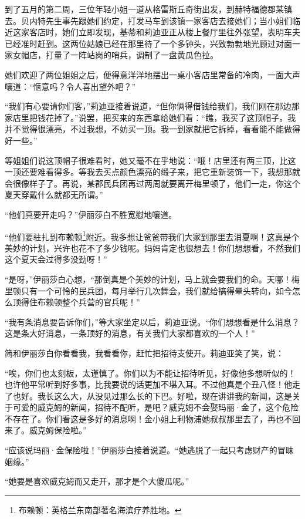 \par 到了五月的第二周，三位年轻小姐一道从格雷斯丘奇街出发，到赫特福德郡某镇去。贝内特先生事先跟她们约定，打发马车到该镇一家客店去接她们；当小姐们临近这家客店时，她们立即发现，基蒂和莉迪亚正从楼上餐厅里往外张望，表明车夫已经准时赶到。这两位姑娘已经在那里待了一个多钟头，兴致勃勃地光顾过对面一家女帽店，打量了一阵站岗的哨兵，调制了一盘黄瓜色拉。
\par 她们欢迎了两位姐姐之后，便得意洋洋地摆出一桌小客店里常备的冷肉，一面大声嚷道：“惬意吗？令人喜出望外吧？”
\par “我们有心要请你们客，”莉迪亚接着说道，“但你俩得借钱给我们，我们刚在那边那家店里把钱花掉了。”说罢，把买来的东西拿给她们看：“瞧，我买了这顶帽子。我并不觉得很漂亮，不过我想，不妨买一顶。我一到家就把它拆掉，看看能不能做得好一些。”
\par 等姐姐们说这顶帽子很难看时，她又毫不在乎地说：“哦！店里还有两三顶，比这一顶还要难看得多。等我去买点颜色漂亮的缎子来，把它重新装饰一下，我想那就会很像样子了。再说，某郡民兵团再过两周就要离开梅里顿了，他们一走，你这个夏天穿戴什么就都无所谓。”
\par “他们真要开走吗？”伊丽莎白不胜宽慰地嚷道。
\par “他们要驻扎到布赖顿\footnote{布赖顿：英格兰东南部著名海滨疗养胜地。}附近。我多想让爸爸带我们大家到那里去消夏啊！这真是个美妙的计划，兴许也花不了多少钱呢。妈妈肯定也很想去！你们想想看，不然我们这个夏天会过得多没劲呀！”
\par “是呀，”伊丽莎白心想，“那倒真是个美妙的计划，马上就会要我们的命。天哪！梅里顿只有一个可怜的民兵团，每月举行几次舞会，我们就给搞得晕头转向，如今怎么顶得住布赖顿整个兵营的官兵呢！”
\par “我有条消息要告诉你们，”等大家坐定以后，莉迪亚说。“你们想想看是什么消息？这是条大好消息，一条顶好的消息，有关我们大家都喜欢的一个人！”
\par 简和伊丽莎白你看看我，我看看你，赶忙把招待支使开。莉迪亚笑了笑，说：
\par “唉，你们也太刻板，太谨慎了。你们以为不能让招待听见，好像他多想听似的！也许他平常听到好多事，比我要说的话更加不堪入耳。不过他真是个丑八怪！他走了也好。我长这么大，从没见过那么长的下巴。好啦，现在讲讲我的新闻，这是关于可爱的威克姆的新闻，招待不配听，是吧？威克姆不会娶玛丽·金了，这个危险不存在了。你们看这是多好的消息啊！金小姐上利物浦她叔叔那里去了，再也不回来了。威克姆保险啦。”
\par “应该说玛丽·金保险啦！”伊丽莎白接着说道。“她逃脱了一起只考虑财产的冒昧姻缘。”
\par “她要是喜欢威克姆而又走开，那才是个大傻瓜呢。”
